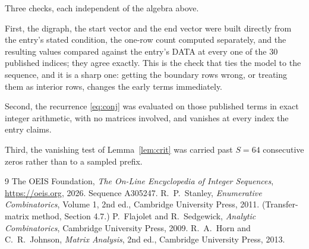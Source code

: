 \documentclass[11pt,a4paper]{article}
\theoremstyle{plain}
\theoremstyle{definition}
\begin{document}
Three checks, each independent of the algebra above.

First, the digraph, the start vector and the end vector were built directly from the
entry's stated condition, the one-row count computed separately, and the resulting values
compared against the entry's DATA at every one of the $30$ published indices; they
agree exactly. This is the check that ties the model to the sequence, and it is a sharp one:
getting the boundary rows wrong, or treating them as interior rows, changes the early terms
immediately.

Second, the recurrence \eqref{eq:conj} was evaluated on those published terms in exact
integer arithmetic, with no matrices involved, and vanishes at every index the entry claims.

Third, the vanishing test of Lemma~\ref{lem:crit} was carried past $S=64$ consecutive
zeros rather than to a sampled prefix.

\begin{thebibliography}{9}
 The OEIS Foundation, \emph{The On-Line Encyclopedia of Integer
Sequences}, \url{https://oeis.org}, 2026. Sequence A305247.
 R.~P.~Stanley, \emph{Enumerative Combinatorics}, Volume 1, 2nd ed.,
Cambridge University Press, 2011. (Transfer-matrix method, Section 4.7.)
 P.~Flajolet and R.~Sedgewick, \emph{Analytic Combinatorics}, Cambridge
University Press, 2009.
 R.~A.~Horn and C.~R.~Johnson, \emph{Matrix Analysis}, 2nd ed., Cambridge
University Press, 2013.
\end{thebibliography}
\end{document}
